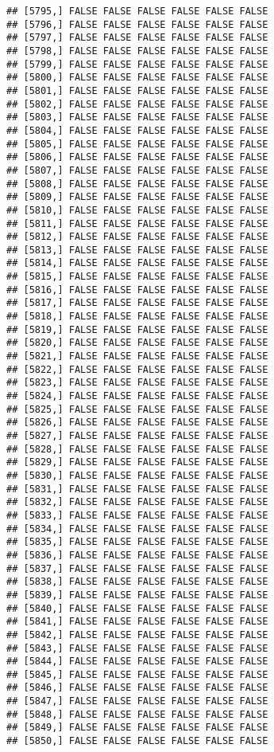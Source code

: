 \documentclass[
]{article}
\begin{document}
\begin{verbatim}
## [5795,] FALSE FALSE FALSE FALSE FALSE FALSE
## [5796,] FALSE FALSE FALSE FALSE FALSE FALSE
## [5797,] FALSE FALSE FALSE FALSE FALSE FALSE
## [5798,] FALSE FALSE FALSE FALSE FALSE FALSE
## [5799,] FALSE FALSE FALSE FALSE FALSE FALSE
## [5800,] FALSE FALSE FALSE FALSE FALSE FALSE
## [5801,] FALSE FALSE FALSE FALSE FALSE FALSE
## [5802,] FALSE FALSE FALSE FALSE FALSE FALSE
## [5803,] FALSE FALSE FALSE FALSE FALSE FALSE
## [5804,] FALSE FALSE FALSE FALSE FALSE FALSE
## [5805,] FALSE FALSE FALSE FALSE FALSE FALSE
## [5806,] FALSE FALSE FALSE FALSE FALSE FALSE
## [5807,] FALSE FALSE FALSE FALSE FALSE FALSE
## [5808,] FALSE FALSE FALSE FALSE FALSE FALSE
## [5809,] FALSE FALSE FALSE FALSE FALSE FALSE
## [5810,] FALSE FALSE FALSE FALSE FALSE FALSE
## [5811,] FALSE FALSE FALSE FALSE FALSE FALSE
## [5812,] FALSE FALSE FALSE FALSE FALSE FALSE
## [5813,] FALSE FALSE FALSE FALSE FALSE FALSE
## [5814,] FALSE FALSE FALSE FALSE FALSE FALSE
## [5815,] FALSE FALSE FALSE FALSE FALSE FALSE
## [5816,] FALSE FALSE FALSE FALSE FALSE FALSE
## [5817,] FALSE FALSE FALSE FALSE FALSE FALSE
## [5818,] FALSE FALSE FALSE FALSE FALSE FALSE
## [5819,] FALSE FALSE FALSE FALSE FALSE FALSE
## [5820,] FALSE FALSE FALSE FALSE FALSE FALSE
## [5821,] FALSE FALSE FALSE FALSE FALSE FALSE
## [5822,] FALSE FALSE FALSE FALSE FALSE FALSE
## [5823,] FALSE FALSE FALSE FALSE FALSE FALSE
## [5824,] FALSE FALSE FALSE FALSE FALSE FALSE
## [5825,] FALSE FALSE FALSE FALSE FALSE FALSE
## [5826,] FALSE FALSE FALSE FALSE FALSE FALSE
## [5827,] FALSE FALSE FALSE FALSE FALSE FALSE
## [5828,] FALSE FALSE FALSE FALSE FALSE FALSE
## [5829,] FALSE FALSE FALSE FALSE FALSE FALSE
## [5830,] FALSE FALSE FALSE FALSE FALSE FALSE
## [5831,] FALSE FALSE FALSE FALSE FALSE FALSE
## [5832,] FALSE FALSE FALSE FALSE FALSE FALSE
## [5833,] FALSE FALSE FALSE FALSE FALSE FALSE
## [5834,] FALSE FALSE FALSE FALSE FALSE FALSE
## [5835,] FALSE FALSE FALSE FALSE FALSE FALSE
## [5836,] FALSE FALSE FALSE FALSE FALSE FALSE
## [5837,] FALSE FALSE FALSE FALSE FALSE FALSE
## [5838,] FALSE FALSE FALSE FALSE FALSE FALSE
## [5839,] FALSE FALSE FALSE FALSE FALSE FALSE
## [5840,] FALSE FALSE FALSE FALSE FALSE FALSE
## [5841,] FALSE FALSE FALSE FALSE FALSE FALSE
## [5842,] FALSE FALSE FALSE FALSE FALSE FALSE
## [5843,] FALSE FALSE FALSE FALSE FALSE FALSE
## [5844,] FALSE FALSE FALSE FALSE FALSE FALSE
## [5845,] FALSE FALSE FALSE FALSE FALSE FALSE
## [5846,] FALSE FALSE FALSE FALSE FALSE FALSE
## [5847,] FALSE FALSE FALSE FALSE FALSE FALSE
## [5848,] FALSE FALSE FALSE FALSE FALSE FALSE
## [5849,] FALSE FALSE FALSE FALSE FALSE FALSE
## [5850,] FALSE FALSE FALSE FALSE FALSE FALSE

\end{verbatim}
\end{document}
